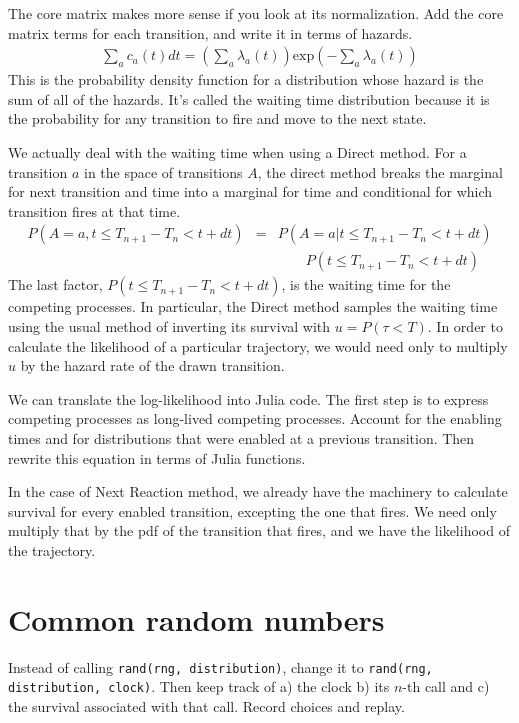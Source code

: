 \documentclass{article}
\begin{document}
The core matrix makes more sense if you look at its normalization. Add the core matrix terms for each transition, and write it in terms of hazards.
\begin{eqnarray}
	\sum_a c_a(t)dt = \left(\sum_a \lambda_a(t)\right)\mbox{exp}\left(-\sum_a \lambda_a(t)\right)
\end{eqnarray}
This is the probability density function for a distribution whose hazard is the sum of all of the hazards. It's called the waiting time distribution because it is the probability for any transition to fire and move to the next state.

We actually deal with the waiting time when using a Direct method. For a transition $a$ in the space of transitions $A$, the direct method breaks the marginal for next transition and time into a marginal for time and conditional for which transition fires at that time.
\begin{eqnarray*}
	P(A=a, t\le T_{n+1}-T_n<t+dt) &=& P(A=a|t\le T_{n+1}-T_n<t+dt) \\
	& & \qquad P(t\le T_{n+1}-T_n<t+dt)
\end{eqnarray*}
The last factor, $P(t\le T_{n+1}-T_n<t+dt)$, is the waiting time for the competing processes. In particular, the Direct method samples the waiting time using the usual method of inverting its survival with $u=P(\tau<T)$. In order to calculate the likelihood of a particular trajectory, we would need only to multiply $u$ by the hazard rate of the drawn transition.

We can translate the log-likelihood into Julia code. The first step is to express competing processes as long-lived competing processes. Account for the enabling times and for distributions that were enabled at a previous transition. Then rewrite this equation in terms of Julia functions.

In the case of Next Reaction method, we already have the machinery to calculate survival for every enabled transition, excepting the one that fires. We need only multiply that by the pdf of the transition that fires, and we have the likelihood of the trajectory.


\section{Common random numbers}

Instead of calling \texttt{rand(rng, distribution)}, change it to \texttt{rand(rng, distribution, clock)}. Then keep track of a) the clock b) its $n$-th call and c) the survival associated with that call. Record choices and replay.
\end{document}
